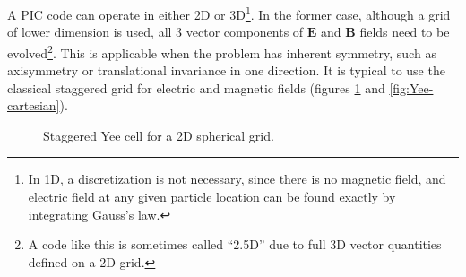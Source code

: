 A PIC code can operate in either 2D or 3D\footnote{In 1D, a discretization is
  not necessary, since there is no magnetic field, and electric field at any
  given particle location can be found exactly by integrating Gauss's law.}.
In the former case, although a grid of lower dimension is used, all 3 vector
components of $\mathbf{E}$ and $\mathbf{B}$ fields need to be
evolved\footnote{A code like this is sometimes called ``2.5D'' due to full 3D vector quantities
  defined on a 2D grid.}. This is applicable when the problem has inherent
symmetry, such as axisymmetry or translational invariance in one direction. It
is typical to use the classical staggered \citet{yee_numerical_1966} grid for
electric and magnetic fields (figures \ref{fig:Yee} and
\ref{fig:Yee-cartesian}).

\begin{figure}[h]
  \centering
  \caption{Staggered Yee cell for a 2D spherical grid.}
  \label{fig:Yee}
\end{figure}

